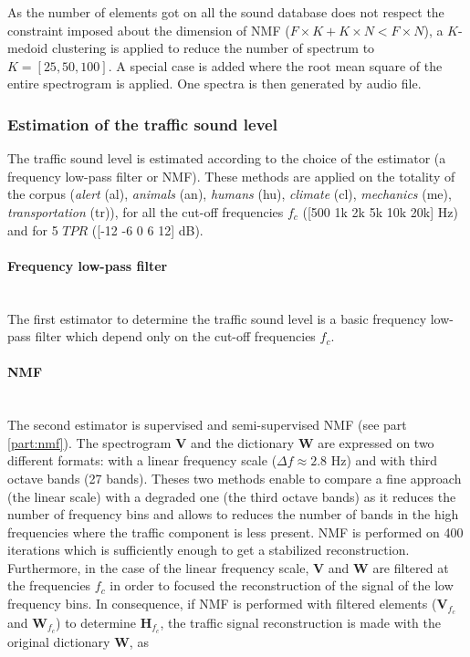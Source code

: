 \documentclass[twocolumn,a4paper,10pt]{article}
\begin{document}
As the number of elements got on all the sound database does not respect the constraint imposed about the dimension of NMF ($F \times K + K \times N < F \times N$), a $K$-medoid clustering is applied to reduce the number of spectrum to $K = \left[ 25, 50, 100 \right]$. A special case is added where the root mean square of the entire spectrogram is applied. One spectra is then generated by audio file.

\subsubsection{Estimation of the traffic sound level}
The traffic sound level is estimated according to the choice of the estimator (a frequency low-pass filter or NMF). These methods are applied on the totality of the corpus (\textit{alert} (al), \textit{animals} (an), \textit{humans} (hu), \textit{climate} (cl), \textit{mechanics} (me), \textit{transportation} (tr)), for all the cut-off frequencies $f_c$ ([500 1k 2k 5k 10k 20k] Hz) and for 5 $TPR$ ([-12 -6 0 6 12] dB).

\paragraph{Frequency low-pass filter}\mbox{} \\
The first estimator to determine the traffic sound level is a basic frequency low-pass filter which depend only on the cut-off frequencies $f_c$.  

\paragraph{NMF}\mbox{} \\
The second estimator is supervised and semi-supervised NMF (see part \ref{part:nmf}). The spectrogram $\mathbf{V}$ and the dictionary $\mathbf{W}$ are expressed on two different formats: with a linear frequency scale ($\Delta f \approx 2.8$ Hz) and with third octave bands (27 bands). Theses two methods enable to compare a fine approach (the linear scale) with a degraded one (the third octave bands) as it reduces the number of frequency bins and allows to reduces the number of bands in the high frequencies where the traffic component is less present. NMF is performed on 400 iterations which is sufficiently enough to get a stabilized reconstruction. Furthermore, in the case of the linear frequency scale, $\mathbf{V}$ and $\mathbf{W}$ are filtered at the frequencies $f_c$ in order to focused the reconstruction of the signal of the low frequency bins. In consequence, if NMF is performed with filtered elements ($\mathbf{V}_{f_c}$ and $\mathbf{W}_{f_c}$) to determine $\mathbf{H}_{f_c}$, the traffic signal reconstruction is made with the original dictionary $\mathbf{W}$, as 
\end{document}

